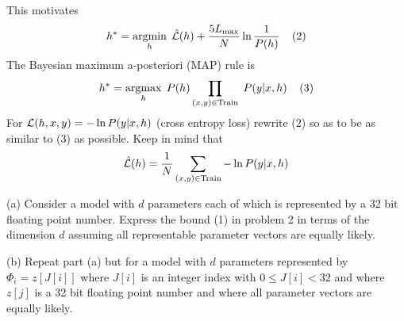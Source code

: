 \documentclass{article}
\newcommand{\solution}[1]{}
\begin{document}
This motivates
$$h^* = \operatorname*{argmin}_h \;\hat{{\cal L}}(h) + \frac{5L_{\max}}{N} \ln\frac{1}{P(h)}\;\;\;\;(2)$$
The Bayesian maximum a-posteriori (MAP)
rule is
$$h^* = \operatorname*{argmax}_h\;P(h)\prod_{(x,y) \in  \mathrm{Train}}\;P(y|x,h)\;\;\;\;(3)$$
For ${\cal L}(h,x,y) = - \ln P(y|x,h)$ (cross entropy loss) rewrite (2) so as to be as similar to
(3) as possible.  Keep in mind that
$$\hat{\cal L}(h) = \frac{1}{N} \sum_{(x,y) \in \mathrm{Train}} -\ln P(y|x,h)$$

\solution{
  \begin{eqnarray*}
    & & \argmin_h \;\left(\frac{1}{N} \sum_{(x,y)\sim \mathrm{Train}}\;-\ln P(y|x,h)\right) + \frac{5\lmax}{N} \ln\frac{1}{P(h)} \\
    \\
    & =  & \argmax_h \;\left(\frac{1}{N} \sum_{(x,y)\sim \mathrm{Train}}\;\ln P(y|x,h)\right) + \frac{5\lmax}{N} \ln P(h) \\
    \\
    & =  & \argmax_h \left(\sum_{(x,y)\sim \mathrm{Train}}\;\ln P(y|x,h)\right) + 5\lmax \ln P(h) \\
    \\
    & =  & \argmax_h \ln \left(P(h)^{5\lmax}\prod_{(x,y)\sim \mathrm{Train}}\; P(y|x,h)\right) \\
    \\
    & = & \argmax_h\;  P(h)^{5\lmax}\prod_{(x,y)\sim \mathrm{Train}}\; P(y|x,h)
  \end{eqnarray*}
}



\medskip
(a) Consider a model with $d$ parameters each of which is represented
by a 32 bit floating point number.  Express the bound (1) in problem 2
in terms of the dimension $d$ assuming all representable parameter
vectors are equally likely.

\solution{
  $${\cal L}(h) \leq \frac{10}{9}\parens{\hat{\cal L}(h) + \frac{5 L_\mathrm{max}}{N}\parens{32d\ln 2 + \ln\frac{1}{\delta}}}$$
}

\medskip
(b) Repeat part (a) but for a model with $d$ parameters represented by
$\Phi_i = z[J[i]]$ where $J[i]$ is an integer index with $0 \leq J[i]
< 32$ and where $z[j]$ is a 32 bit floating point number and where all parameter vectors are equally likely.

\solution{
  $${\cal L}(h) \leq \frac{10}{9}\parens{\hat{\cal L}(h) + \frac{5 L_\mathrm{max}}{N}\parens{(32^2 + 5d)\ln 2 + \ln\frac{1}{\delta}}}$$
}
\end{document}
